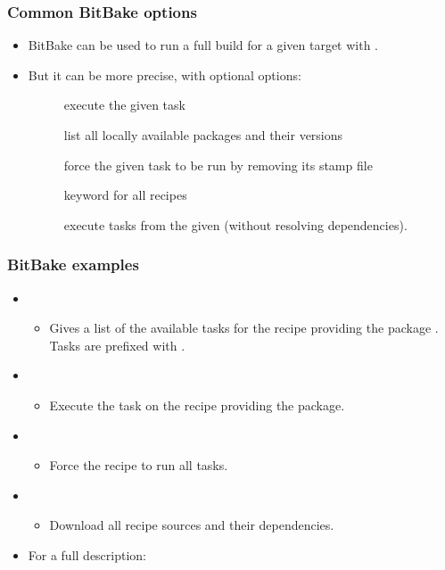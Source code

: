 \begin{frame}
  \frametitle{Common BitBake options}
  \begin{itemize}
    \item BitBake can be used to run a full build for a given target
      with .
    \item But it can be more precise, with optional options:
    \begin{description}
      \item[] execute the given task
      \item[] list all locally available packages and their
        versions
      \item[] force the given task to be run by removing its
        stamp file
      \item[] keyword for all recipes
      \item[] execute tasks from the given
         (without resolving dependencies).
    \end{description}
  \end{itemize}
\end{frame}

\begin{frame}
  \frametitle{BitBake examples}
  \begin{itemize}
    \item {}
    \begin{itemize}
      \item Gives a list of the available tasks for the recipe
        providing the package . Tasks are
        prefixed with .
    \end{itemize}
    \item {}
    \begin{itemize}
      \item Execute the task  on the recipe providing
        the  package.
    \end{itemize}
    \item {}
    \begin{itemize}
      \item Force the  recipe to run all tasks.
    \end{itemize}
    \item {}
    \begin{itemize}
      \item Download all recipe sources and their dependencies.
    \end{itemize}
    \item For a full description: 
  \end{itemize}
\end{frame}

